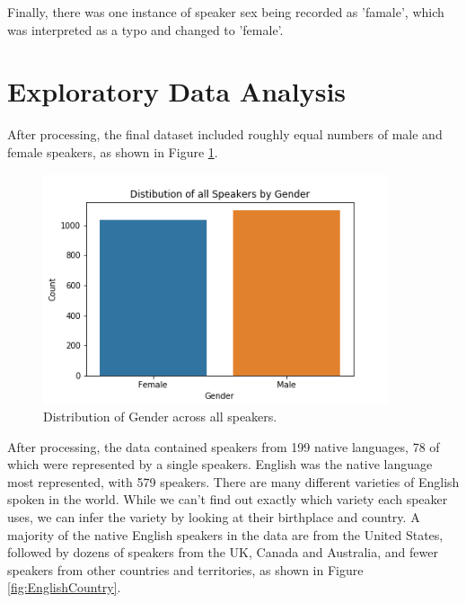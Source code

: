 Finally, there was one instance of speaker sex being recorded as 'famale', which was interpreted as a typo and changed to 'female'. 

\section{Exploratory Data Analysis}

After processing, the final dataset included roughly equal numbers of male and female speakers, as shown in Figure \ref{fig:GenderDistAll}.

\begin{figure}[h]
\begin{center}
\includegraphics[width=4in]{GenderDistAll.png}
\caption{Distribution of Gender across all speakers.}
\label{fig:GenderDistAll}
\end{center}
\end{figure}

After processing, the data contained speakers from 199 native languages, 78 of which were represented by a single speakers.  English was the native language most represented, with 579 speakers. There are many different varieties of English spoken in the world. While we can't find out exactly which variety each speaker uses, we can infer the variety by looking at their birthplace and country. A majority of the native English speakers in the data are from the United States, followed by dozens of speakers from the UK, Canada and Australia, and fewer speakers from other countries and territories, as shown in Figure \ref{fig:EnglishCountry}.

